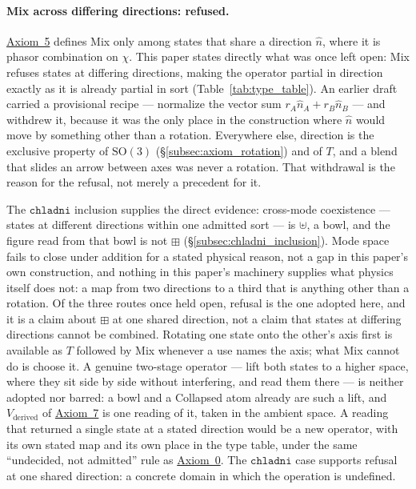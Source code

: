\documentclass[12pt, a4paper]{article}
\begin{document}
\paragraph{Mix across differing directions: refused.}
\label{subsec:mix_scattered_open}
\hyperref[subsec:axiom_interference]{Axiom~5} defines Mix only among states
that share a direction $\hat n$, where it is phasor combination on
$\chi$. This paper states directly what was once left open: Mix
refuses states at differing directions, making the operator partial
in direction exactly as it is already partial in sort
(Table~\ref{tab:type_table}). An earlier draft carried a provisional
recipe --- normalize the vector sum $r_A\hat n_A+r_B\hat n_B$ --- and
withdrew it, because it was the only place in the construction where
$\hat n$ would move by something other than a rotation. Everywhere
else, direction is the exclusive property of $\mathrm{SO}(3)$
(\S\ref{subsec:axiom_rotation}) and of $T$, and a blend that slides
an arrow between axes was never a rotation. That withdrawal is the
reason for the refusal, not merely a precedent for it.

The $\mathtt{chladni}$ inclusion supplies the direct evidence:
cross-mode coexistence --- states at different directions within one
admitted sort --- is $\uplus$, a bowl, and the figure read from that
bowl is not $\boxplus$ (\S\ref{subsec:chladni_inclusion}). Mode space
fails to close under addition for a stated physical reason, not a
gap in this paper's own construction, and nothing in this paper's
machinery supplies what physics itself does not: a map from two
directions to a third that is anything other than a rotation. Of the three routes once held open, refusal is the one adopted here, and it is a claim about $\boxplus$ at one shared direction, not a claim that states at differing directions cannot be combined. Rotating one state onto the other's axis first is available as $T$ followed by Mix whenever a use names the axis; what Mix cannot do is choose it. A genuine two-stage operator --- lift both states to a higher space, where they sit side by side without interfering, and read them there --- is neither adopted nor barred: a bowl and a Collapsed atom already are such a lift, and $V_{\text{derived}}$ of \hyperref[subsec:axiom_v1_metrics]{Axiom~7} is one reading of it, taken in the ambient space. A reading that returned a single state at a stated direction would be a new operator, with its own stated map and its own place in the type table, under the same ``undecided, not admitted'' rule as \hyperref[subsec:axiom0_admissibility]{Axiom~0}. The $\mathtt{chladni}$ case supports refusal at one shared direction: a concrete domain in which the operation is undefined.
\end{document}
